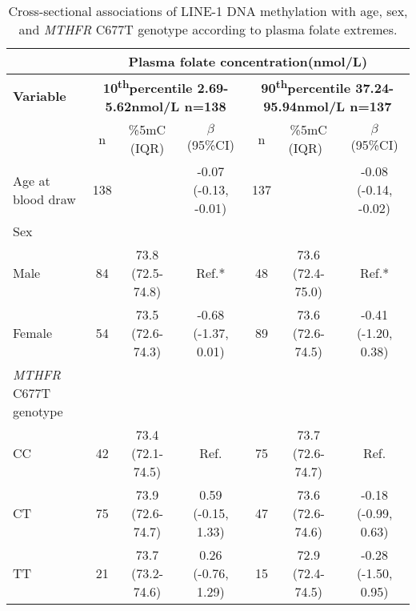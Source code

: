 \begin{flushleft}
\begin{table}
\caption{Cross-sectional associations of LINE-1 DNA methylation with age, sex, and \emph{MTHFR} C677T genotype according to plasma folate extremes.}\label{table3_2}\tablehead{}
\begin{adjustbox}{width=\textwidth}
\begin{tabular}{lcccccc}
\hline 
~ &\multicolumn{6}{c}{\centering Plasma folate concentration(nmol/L)}\\
\hline 
\bfseries Variable 
&\multicolumn{3}{c}{\parbox[t]{3cm}{\centering \textbf{ 10\textsuperscript{th}percentile 2.69-5.62nmol/L  n=138}}} 
&\multicolumn{3}{c}{\parbox[t]{3cm}{\centering \textbf{ 90\textsuperscript{th}percentile 37.24-95.94nmol/L n=137}}}\\
~ & n & \%5mC (IQR) & $\beta $ (95\%CI) & n &{ \%5mC (IQR)}~ & $\beta $ (95\%CI)\\
\hline 
 Age at blood draw & 138 &~ & {}-0.07 (-0.13, -0.01) & 137 &~ & {}-0.08 (-0.14, -0.02)\\
 \hline 
 \multicolumn{1}{l}{Sex} &~ &~ &~ &~ &~ &~\\ 
 \quad Male & 84 & 73.8 (72.5-74.8) & Ref.* & 48 & 73.6 (72.4-75.0) & Ref.*\\ 
 Female & 54 & 73.5 (72.6-74.3) & -0.68 (-1.37, 0.01) & 89 & 73.6 (72.6-74.5) & {}-0.41 (-1.20, 0.38)\\
 \hline 
 {\textit{MTHFR}}{ C677T genotype}&~ &~ &~ &~ &~ &~\\ 
 CC & 42 & 73.4 (72.1-74.5) & Ref. & 75 & 73.7 (72.6-74.7) & Ref.\\ 
 CT & 75 & 73.9 (72.6-74.7) & 0.59 (-0.15, 1.33) & 47 & 73.6 (72.6-74.6) & {}-0.18 (-0.99, 0.63)\\ 
 TT & 21 & 73.7 (73.2-74.6) & 0.26 (-0.76, 1.29) & 15 & 72.9 (72.4-74.5) & {}-0.28 (-1.50, 0.95)\\
 \hline 
\end{tabular}
\end{adjustbox}
\end{table}
\end{flushleft}



